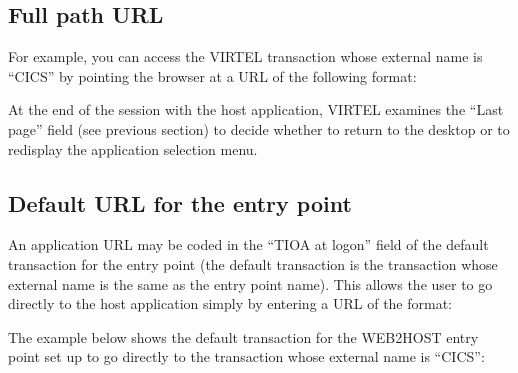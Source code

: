 \documentclass[letterpaper,10pt,english]{sphinxmanual}
\begin{document}
\subsection{Full path URL}
\label{\detokenize{Customization:full-path-url}}
For example, you can access the VIRTEL transaction whose external name is “CICS” by pointing the browser at a URL of the following format:

\begin{sphinxVerbatim}[commandchars=\\\{\}]
\end{sphinxVerbatim}

At the end of the session with the host application, VIRTEL examines the “Last page” field (see previous section) to decide whether to return to the desktop or to redisplay the application selection menu.

\ignorespaces 

\subsection{Default URL for the entry point}
\label{\detokenize{Customization:default-url-for-the-entry-point}}\label{\detokenize{Customization:index-59}}
An application URL may be coded in the “TIOA at logon” field of the default transaction for the entry point (the default transaction is the transaction whose external name is the same as the entry point name). This allows the user to go directly to the host application simply by entering a URL of the format:

\begin{sphinxVerbatim}[commandchars=\\\{\}]
\end{sphinxVerbatim}

The example below shows the default transaction for the WEB2HOST entry point set up to go directly to the transaction whose external name is “CICS”:
\end{document}
